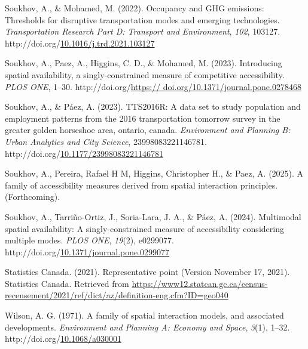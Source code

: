 \documentclass[
11pt, %
oneside, %
english, %
singlespacing, %
]{macthesis} %
\newlength{\cslhangindent}
\newenvironment{CSLReferences}[2] %
{\begin{list}{}{%
	\setlength{\itemindent}{0pt}
	\setlength{\leftmargin}{0pt}
	\setlength{\parsep}{0pt}
	\ifodd #1
	\setlength{\leftmargin}{\cslhangindent}
	\setlength{\itemindent}{-1\cslhangindent}
	\fi
	\setlength{\itemsep}{#2\baselineskip}}}
{\end{list}}
\begin{document}
\begin{CSLReferences}{1}{0}
Soukhov, A., \& Mohamed, M. (2022). Occupancy and {GHG} emissions: Thresholds for disruptive transportation modes and emerging technologies. \emph{Transportation Research Part D: Transport and Environment}, \emph{102}, 103127. http://doi.org/\href{https://doi.org/10.1016/j.trd.2021.103127}{10.1016/j.trd.2021.103127}

Soukhov, A., Paez, A., Higgins, C. D., \& Mohamed, M. (2023). Introducing spatial availability, a singly-constrained measure of competitive accessibility. \emph{{PLOS} {ONE}}, 1--30. http://doi.org/\href{https://\%20doi.org/10.1371/journal.pone.0278468}{https:// doi.org/10.1371/journal.pone.0278468}

Soukhov, A., \& Páez, A. (2023). {TTS}2016R: A data set to study population and employment patterns from the 2016 transportation tomorrow survey in the greater golden horseshoe area, ontario, canada. \emph{Environment and Planning B: Urban Analytics and City Science}, 23998083221146781. http://doi.org/\href{https://doi.org/10.1177/23998083221146781}{10.1177/23998083221146781}

Soukhov, A., Pereira, Rafael H M, Higgins, Christopher H., \& Paez, A. (2025). A family of accessibility measures derived from spatial interaction principles. (Forthcoming).

Soukhov, A., Tarriño-Ortiz, J., Soria-Lara, J. A., \& Páez, A. (2024). Multimodal spatial availability: A singly-constrained measure of accessibility considering multiple modes. \emph{{PLOS} {ONE}}, \emph{19}(2), e0299077. http://doi.org/\href{https://doi.org/10.1371/journal.pone.0299077}{10.1371/journal.pone.0299077}

Statistics Canada. (2021). Representative point (Version November 17, 2021). Statistics Canada. Retrieved from \url{https://www12.statcan.gc.ca/census-recensement/2021/ref/dict/az/definition-eng.cfm?ID=geo040}

Wilson, A. G. (1971). A family of spatial interaction models, and associated developments. \emph{Environment and Planning A: Economy and Space}, \emph{3}(1), 1--32. http://doi.org/\href{https://doi.org/10.1068/a030001}{10.1068/a030001}

\end{CSLReferences}
\end{document}
